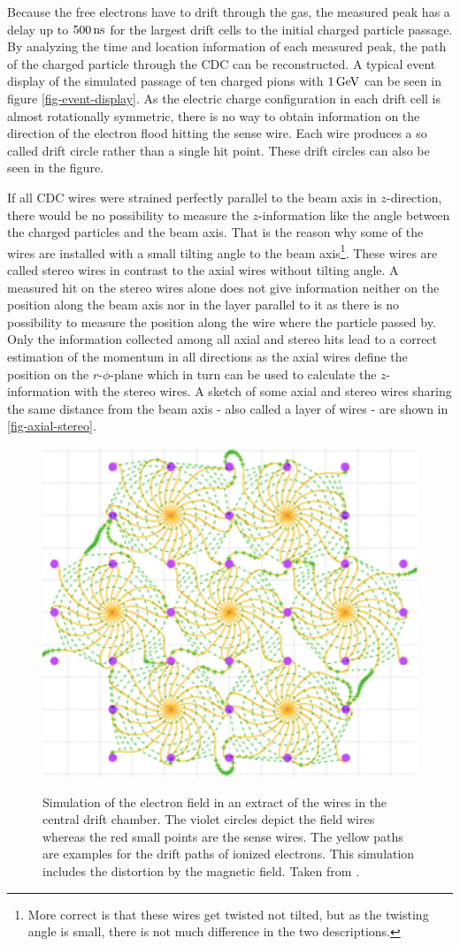 Because the free electrons have to drift through the gas, the measured peak has a delay up to $\unit[500]{ns}$ for the largest drift cells to the initial charged particle passage. By analyzing the time and location information of each measured peak, the path of the charged particle through the CDC can be reconstructed. A typical event display of the simulated passage of ten charged pions with $\unit[1]{GeV}$ can be seen in figure \ref{fig-event-display}. As the electric charge configuration in each drift cell is almost rotationally symmetric, there is no way to obtain information on the direction of the electron flood hitting the sense wire. Each wire produces a so called drift circle rather than a single hit point. These drift circles can also be seen in the figure.

If all CDC wires were strained perfectly parallel to the beam axis in $z$-direction, there would be no possibility to measure the $z$-information like the angle between the charged particles and the beam axis. That is the reason why some of the wires are installed with a small tilting angle to the beam axis\footnote{More correct is that these wires get twisted not tilted, but as the twisting angle is small, there is not much difference in the two descriptions.}. These wires are called stereo wires in contrast to the axial wires without tilting angle. A measured hit on the stereo wires alone does not give information neither on the position along the beam axis nor in the layer parallel to it as there is no possibility to measure the position along the wire where the particle passed by. Only the information collected among all axial and stereo hits lead to a correct estimation of the momentum in all directions as the axial wires define the position on the $r$-$\phi$-plane which in turn can be used to calculate the $z$-information with the stereo wires. A sketch of some axial and stereo wires sharing the same distance from the beam axis - also called a layer of wires - are shown in \ref{fig-axial-stereo}.

\begin{figure}
  \caption[Simulation of the electron field in the central drift chamber.]{Simulation of the electron field in an extract of the wires in the central drift chamber. The violet circles depict the field wires whereas the red small points are the sense wires. The yellow paths are examples for the drift paths of ionized electrons. This simulation includes the distortion by the magnetic field. Taken from \cite{cdc_design}.}
  \includegraphics[width=0.5\linewidth]{figures/experimental_setup/electronsInCDC.pdf}
  \label{fig-sense-wires}
\end{figure}


